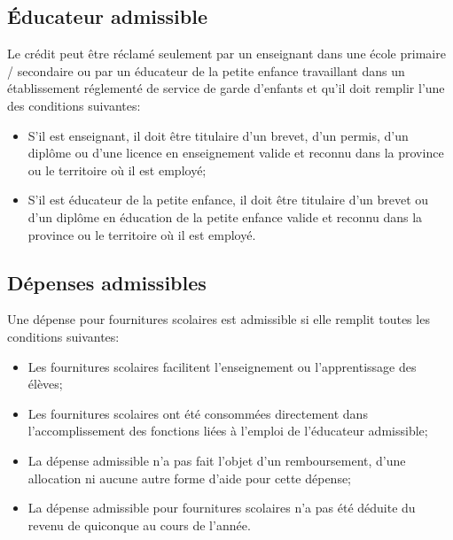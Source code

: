 \subsection{Éducateur admissible}
Le crédit peut être réclamé seulement par un enseignant dans une école primaire / secondaire ou par un éducateur de la petite enfance travaillant dans un établissement réglementé de service de garde d'enfants et qu'il doit remplir l'une des conditions suivantes:
\begin{itemize}
	\item S'il est enseignant, il doit être titulaire d'un brevet, d'un permis, d'un diplôme ou d'une licence en enseignement valide et reconnu dans la province ou le territoire où il est employé;
	\item S'il est éducateur de la petite enfance, il doit être titulaire d'un brevet ou d'un diplôme en éducation de la petite enfance valide et reconnu dans la province ou le territoire où il est employé.
\end{itemize}


\subsection{Dépenses admissibles}
Une dépense pour fournitures scolaires est admissible si elle remplit toutes les conditions suivantes:
\begin{itemize}[label=]
	\item Les fournitures scolaires facilitent l'enseignement ou l'apprentissage des élèves;
	\item Les fournitures scolaires ont été consommées directement dans l'accomplissement des fonctions liées à l'emploi de l'éducateur admissible;
	\item La dépense admissible n'a pas fait l'objet d'un remboursement, d'une allocation ni aucune autre forme d'aide pour cette dépense;
	\item La dépense admissible pour fournitures scolaires n'a pas été déduite du revenu de quiconque au cours de l'année.
\end{itemize}

